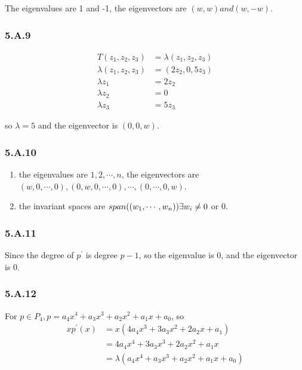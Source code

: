 The eigenvalues are 1 and -1, the eigenvectors are $(w, w) and (w, -w)$.

\subsubsection*{5.A.9}
\begin{equation*}
    \begin{split}
    T(z_{1}, z_{2}, z_{3}) &= \lambda (z_{1}, z_{2}, z_{3}) \\
    \lambda(z_{1}, z_{2}, z_{3}) &= (2z_{2}, 0, 5z_{3}) \\
    \lambda z_{1} &= 2z_{2} \\
    \lambda z_{2} &= 0 \\
    \lambda z_{3} &= 5z_{3}
\end{split}
\end{equation*}

so $\lambda = 5$ and the eigenvector is $(0, 0, w)$.

\subsubsection*{5.A.10}

\begin{enumerate}[label=(\alph*)]
\item the eigenvalues are $1, 2, \cdots, n$, the eigenvectors are $(w, 0, \cdots, 0), (0, w, 0, \cdots, 0), \cdots, (0, \cdots, 0, w)$.
\item the invariant spaces are $span((w_{1},\cdots,w_{n})) \exists w_{i} \neq 0$ or ${0}$.
\end{enumerate}

\subsubsection*{5.A.11}
Since the degree of $p^{'}$ is degree $p - 1$, so the eigenvalue is 0, and the eigenvector is $0$.

\subsubsection*{5.A.12}

For $p\in P_{4}, p = a_{4}x^{4} + a_{3}x^{3} + a_{2}x^{2} + a_{1}x + a_{0}$, so 
\begin{equation*}
    \begin{split}
    xp^{'}(x) &= x(4a_{4}x^{3} + 3a_{3}x^{2} + 2a_{2}x + a_{1}) \\
    &= 4a_{4}x^{4} + 3a_{3}x^{3} + 2a_{2}x^{2} + a_{1}x \\
    & = \lambda (a_{4}x^{4} + a_{3}x^{3} + a_{2}x^{2} + a_{1}x + a_{0})
\end{split}
\end{equation*}

